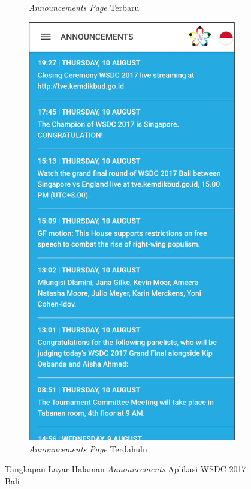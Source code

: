 \begin{figure}[H]
\begin{subfigure}[b]{0.3\textwidth}
         \caption{\textit{Announcements Page} Terbaru}
         \label{fig:ssAnnouncements}
     \end{subfigure}
     \hspace*{0.5in}
     \begin{subfigure}[b]{0.3\textwidth}
         \centering
         \includegraphics[width=\textwidth]{Gambar/AnnouncementsPage.png}
         \caption{\textit{Announcements Page} Terdahulu}
         \label{fig:ssAnnouncementsOld}
     \end{subfigure}
        \caption{Tangkapan Layar Halaman \textit{Announcements} Aplikasi WSDC 2017 Bali}
        \label{fig:ssApk1}
\end{figure}


